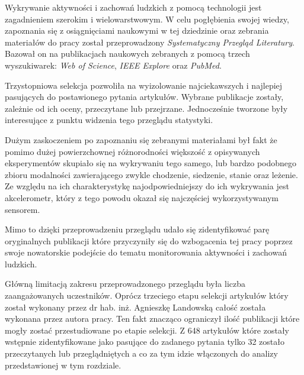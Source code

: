 Wykrywanie aktywności i zachowań ludzkich z pomocą technologii jest zagadnieniem szerokim i wielowarstwowym. W celu pogłębienia swojej wiedzy, zapoznania się z osiągnięciami naukowymi w tej dziedzinie oraz zebrania materiałów do pracy został przeprowadzony \textit{Systematyczny Przegląd Literatury}. Bazował on na publikacjach naukowych zebranych z pomocą trzech wyszukiwarek: \textit{Web of Science}, \textit{IEEE Explore} oraz \textit{PubMed}. 

Trzystopniowa selekcja pozwoliła na wyizolowanie najciekawszych i najlepiej pasujących do postawionego pytania artykułów. Wybrane publikacje zostały, zależnie od ich oceny, przeczytane lub przejrzane. Jednocześnie tworzone były interesujące z punktu widzenia tego przeglądu statystyki. 

Dużym zaskoczeniem po zapoznaniu się zebranymi materiałami był fakt że pomimo dużej powierzchownej  różnorodności większość z opisywanych eksperymentów skupiało się na wykrywaniu tego samego, lub bardzo podobnego zbioru modalności zawierającego zwykle chodzenie, siedzenie, stanie oraz leżenie. Ze względu na ich charakterystykę najodpowiedniejszy do ich wykrywania jest akcelerometr, który z tego powodu okazał się najczęściej wykorzystywanym sensorem.

Mimo to dzięki przeprowadzeniu przeglądu udało się zidentyfikować parę oryginalnych publikacji które przyczyniły się do wzbogacenia tej pracy poprzez swoje nowatorskie podejście do tematu monitorowania aktywności i zachowań ludzkich.

Główną limitacją zakresu przeprowadzonego przeglądu była liczba zaangażowanych uczestników. Oprócz trzeciego etapu selekcji artykułów który został wykonany przez dr hab. inż. Agnieszkę Landowską całość została wykonana przez autora pracy. Ten fakt znacząco ograniczył ilość publikacji które mogły zostać przestudiowane po etapie selekcji. Z 648 artykułów które zostały wstępnie zidentyfikowane jako pasujące do zadanego pytania tylko 32 zostało przeczytanych lub przeglądniętych a co za tym idzie włączonych do analizy przedstawionej w tym rozdziale.
